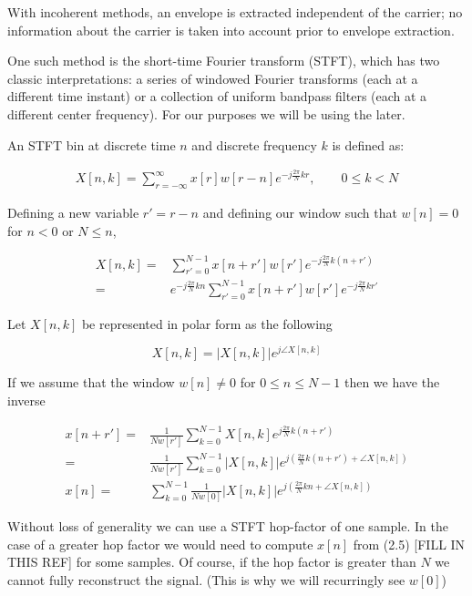 \documentclass [11pt, proquest] {uwthesis}[2015/03/03]
\begin{document}
With incoherent methods, an envelope is extracted independent of the carrier; no information about the carrier is taken into account prior to envelope extraction.

One such method is the short-time Fourier transform (STFT), which has two classic interpretations: a series of windowed Fourier transforms (each at a different time instant) or a collection of uniform bandpass filters (each at a different center frequency).  For our purposes we will be using the later.

An STFT bin at discrete time $n$ and discrete frequency $k$ is defined as:

\begin{align}
\label{eq:STFTdefinition}
X[n,k] = \sum\limits_{r=-\infty}^{\infty} x[r] w[r - n] e^{-j\frac{2\pi}{N}kr}, \qquad 0 \leq k < N
\end{align}

Defining a new variable $r' = r - n$ and defining our window such that  $w[n] = 0$ for $n < 0$ or $N \leq n$,

\begin{align}
X[n,k] =& \sum\limits_{r'=0}^{N-1} x[n + r'] w[r'] e^{-j\frac{2\pi}{N}k(n + r')} \nonumber \\
=& e^{-j\frac{2\pi}{N}kn} \sum\limits_{r'=0}^{N-1} x[n + r'] w[r'] e^{-j\frac{2\pi}{N}kr'}
\end{align}

Let $X[n,k]$ be represented in polar form as the following

\begin{equation}
X[n,k] = \vert X[n,k]\vert e^{j\angle X[n,k]}
\end{equation}

If we assume that the window $w[n] \neq 0$ for $0 \leq n \leq N-1$ then we have the inverse

\begin{align}
x[n + r'] =& \frac{1}{Nw[r']}  \sum\limits_{k=0}^{N-1} X[n,k] e^{j\frac{2\pi}{N}k(n+r')} \nonumber \\
=& \frac{1}{Nw[r']}  \sum\limits_{k=0}^{N-1} \vert X[n,k]\vert e^{j(\frac{2\pi}{N}k(n+r') + \angle X[n,k])} \\
x[n] =&\sum\limits_{k=0}^{N-1}  \frac{1}{Nw[0]}  \vert X[n,k]\vert e^{j(\frac{2\pi}{N}kn + \angle X[n,k])}
\end{align}

Without loss of generality we can use a STFT hop-factor of one sample.  In the case of a greater hop factor we would need to compute $x[n]$ from (2.5) [FILL IN THIS REF] for some samples.  Of course, if the hop factor is greater than $N$ we cannot fully reconstruct the signal.  (This is why we will recurringly see $w[0]$)
\end{document}
